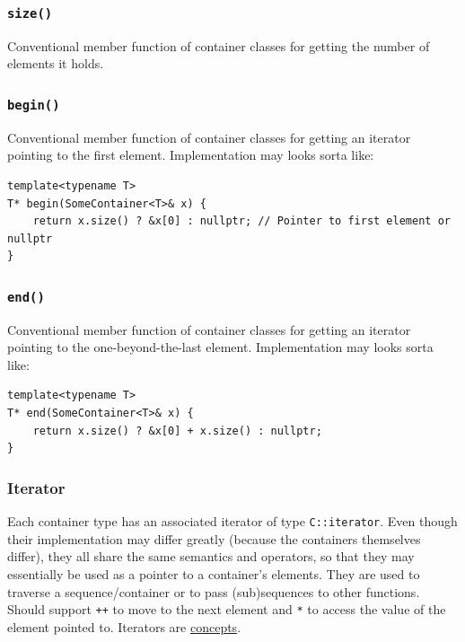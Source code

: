 \documentclass[table, xcdraw]{article}%
\begin{document}
\subsubsection{\texttt{size()}}

Conventional member function of container classes for getting the number of elements it holds.

\subsubsection{\texttt{begin()}} \label{begin}

Conventional member function of container classes for getting an iterator pointing to the first element. Implementation may looks sorta like:

\begin{verbatim}
template<typename T>
T* begin(SomeContainer<T>& x) {
    return x.size() ? &x[0] : nullptr; // Pointer to first element or nullptr
}
\end{verbatim}

\subsubsection{\texttt{end()}}

Conventional member function of container classes for getting an iterator pointing to the one-beyond-the-last element. Implementation may looks sorta like:

\begin{verbatim}
template<typename T>
T* end(SomeContainer<T>& x) {
    return x.size() ? &x[0] + x.size() : nullptr;
}
\end{verbatim}

\subsubsection{Iterator}

Each container type has an associated iterator of type \texttt{C::iterator}. Even though their implementation may differ greatly (because the containers themselves differ), they all share the same semantics and operators, so that they may essentially be used as a pointer to a container's elements. They are used to traverse a sequence/container or to pass (sub)sequences to other functions.  Should support \texttt{++} to move to the next element and \texttt{*} to access the value of the element pointed to. Iterators are \hyperref[concepts]{concepts}.
\end{document}
